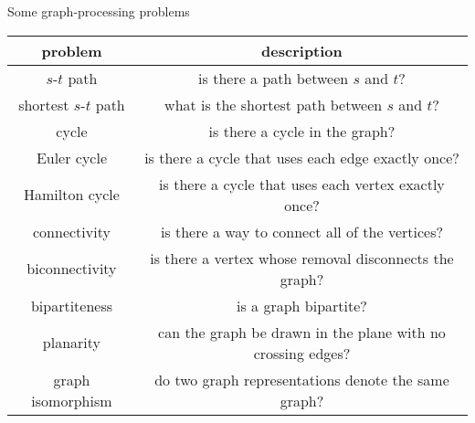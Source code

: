 \documentclass[8pt,a4paper,compress]{beamer}
\begin{document}
\begin{frame}[fragile]
\pause

Some graph-processing problems
\begin{center}
\begin{tabular}{cc}
problem & description \\ \hline
$s$-$t$ path & is there a path between $s$ and $t$? \\ 
shortest $s$-$t$ path & what is the shortest path between $s$ and $t$? \\
cycle & is there a cycle in the graph? \\
Euler cycle & is there a cycle that uses each edge exactly once? \\
Hamilton cycle & is there a cycle that uses each vertex exactly once? \\
connectivity & is there a way to connect all of the vertices? \\
biconnectivity & is there a vertex whose removal disconnects the graph? \\
bipartiteness & is a graph bipartite? \\ 
planarity & can the graph be drawn in the plane with no crossing edges? \\
graph isomorphism & do two graph representations denote the same graph?
\end{tabular}  
\end{center}
\end{frame}
\end{document}
